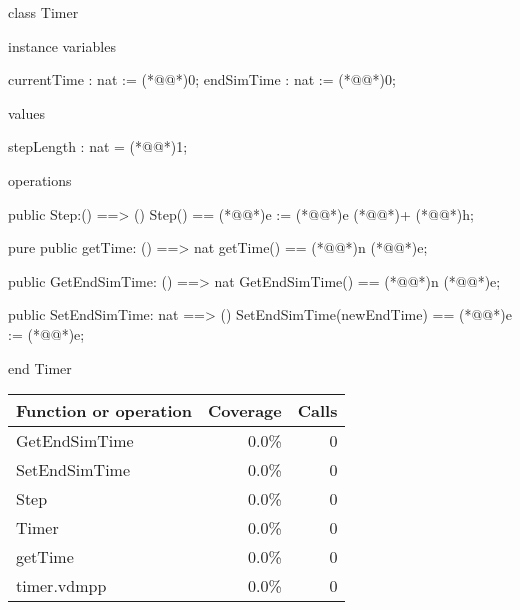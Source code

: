 \documentclass[a4paper]{article}
\begin{document}
\title{}
\author{}
\begin{vdm_al}
class Timer 

instance variables

  currentTime : nat := (*@\vdmnotcovered{}@*)0;
  endSimTime : nat := (*@\vdmnotcovered{}@*)0;

values 

  stepLength : nat = (*@\vdmnotcovered{}@*)1;

operations

public 
  Step:() ==> ()
  Step() == 
    (*@@*)e := (*@@*)e (*@\vdmnotcovered{}@*)+ (*@@*)h;

pure public
  getTime: () ==> nat 
  getTime() == 
  (*@@*)n (*@@*)e;
  
public
  GetEndSimTime: () ==> nat
  GetEndSimTime() == 
  (*@@*)n (*@@*)e;

public SetEndSimTime: nat ==> ()
SetEndSimTime(newEndTime) == 
  (*@@*)e := (*@@*)e;

end Timer
\end{vdm_al}
\bigskip
\begin{longtable}{|l|r|r|}
\hline
Function or operation & Coverage & Calls \\
\hline
\hline
GetEndSimTime & 0.0\% & 0 \\
\hline
SetEndSimTime & 0.0\% & 0 \\
\hline
Step & 0.0\% & 0 \\
\hline
Timer & 0.0\% & 0 \\
\hline
getTime & 0.0\% & 0 \\
\hline
\hline
timer.vdmpp & 0.0\% & 0 \\
\hline
\end{longtable}
\end{document}
